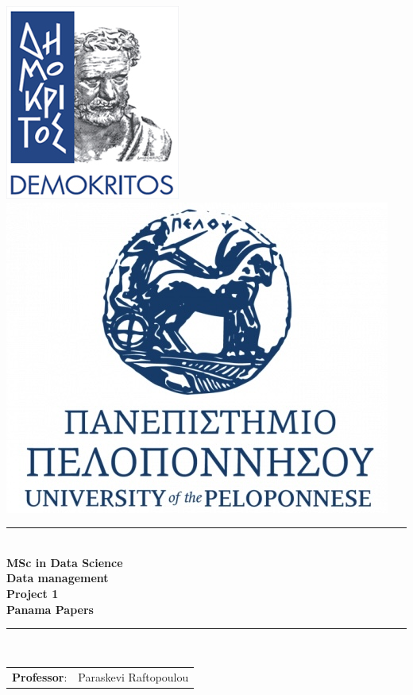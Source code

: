 \documentclass{article}
\begin{document}
\begin{titlepage}
    \begin{center}

        \includegraphics[scale=0.6]{ncsr_logo.jpg}
        \includegraphics[scale=0.5]{uop_logo.jpg} \\[1cm]


        \rule{0.8\textwidth}{2pt} \\[0.5cm]
        \textbf{\Large{MSc in Data Science}} \\[0.5cm]
        \textbf{\Large{Data management}} \\[1.5cm]
        \textbf{\Large{Project 1}} \\[0.5cm]
        \textbf{{\Large{Panama Papers}}} \\[0.1cm]
        \rule{0.8\textwidth}{2pt} \\[1cm]

        \begin{tabular}{ll}
            \large{\textbf{Professor}:} & \large{Paraskevi Raftopoulou}
        \end{tabular}


\end{center}
\end{titlepage}
\end{document}
